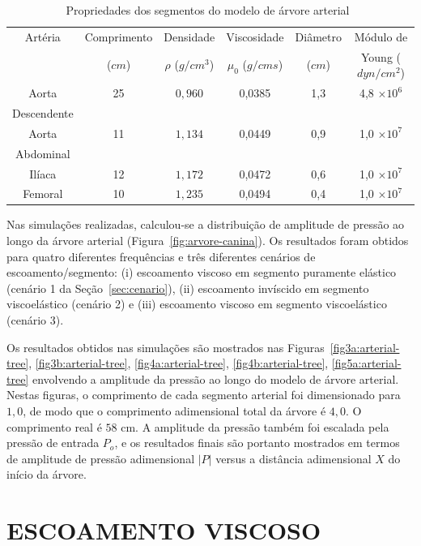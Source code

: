 \begin{table}[!htbp]
	\caption{Propriedades dos segmentos do modelo de árvore arterial~\cite{Duan,Fung}}
	\centering{}
	\begin{tabular}{c|c|c|c|c|c}
		\toprule 
		Artéria	& Comprimento & Densidade & Viscosidade  & Diâmetro & Módulo de  \\ 
		& ($cm$) & $\rho$ ($g/cm^3$) & $\mu_0$ ($g/cm s$) & ($cm$) & Young ($dyn/cm^2$) \\ 
		\midrule 
		Aorta & 25 & $0,960$ & 0,0385 & 1,3 &4,8 $\times 10^6$ \\ 
		Descendente &  & &  & & \\ 
		\hline 
		Aorta & 11 & $1,134$ & 0,0449 & 0,9 & 1,0 $\times 10^7$ \\
		Abdominal &  & &  & &  \\ 
		\hline 
		Ilíaca & 12 & $1,172$ & 0,0472 & 0,6 & 1,0 $\times 10^7$\\ 
		\hline 
		Femoral & 10 & $1,235$ & 0,0494 & 0,4 & 1,0 $\times 10^7$\\ 
		\bottomrule 
	\end{tabular} 
	\label{tab1:proprerty}
\end{table}

Nas simulações realizadas, calculou-se a distribuição de amplitude de pressão ao longo da árvore arterial (Figura~\ref{fig:arvore-canina}). Os resultados foram obtidos para quatro diferentes frequên\-cias e três diferentes cenários de escoamento/segmento: (i) escoamento viscoso em segmento puramente elástico (cenário 1 da Seção~\ref{sec:cenario}), (ii) escoamento invíscido em segmento viscoelástico (cenário 2) e (iii) escoamento viscoso em segmento viscoelástico (cenário 3). 

Os resultados obtidos nas simulações são mostrados nas Figuras~\ref{fig3a:arterial-tree}, \ref{fig3b:arterial-tree}, \ref{fig4a:arterial-tree}, \ref{fig4b:arterial-tree}, \ref{fig5a:arterial-tree} envolvendo a amplitude da pressão ao longo do modelo de árvore arterial. Nestas figuras, o comprimento de cada segmento arterial foi dimensionado para $1,0$, de modo que o comprimento adimensional total da árvore é $4,0$. O comprimento real é $58$ cm. A amplitude da pressão também foi escalada pela pressão de entrada $P_o$, e os resultados finais são portanto mostrados em termos de amplitude de pressão adimensional $|P|$ versus a distância adimensional $X$ do início da árvore.


\section{ESCOAMENTO VISCOSO}\label{sec:cenario1}

